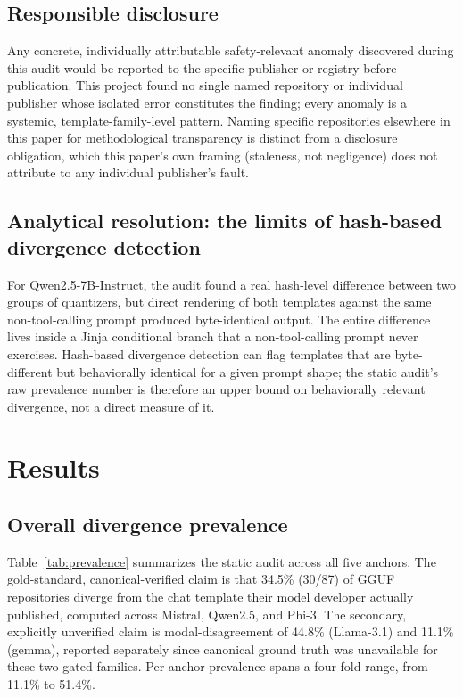 \documentclass[letterpaper,twocolumn,10pt]{article}
\begin{document}
\subsection{Responsible disclosure}

Any concrete, individually attributable safety-relevant anomaly discovered during this audit would be reported to the specific publisher or registry before publication. This project found no single named repository or individual publisher whose isolated error constitutes the finding; every anomaly is a systemic, template-family-level pattern. Naming specific repositories elsewhere in this paper for methodological transparency is distinct from a disclosure obligation, which this paper's own framing (staleness, not negligence) does not attribute to any individual publisher's fault.

\subsection{Analytical resolution: the limits of hash-based divergence detection}
\label{sec:analytical-resolution}

For Qwen2.5-7B-Instruct, the audit found a real hash-level difference between two groups of quantizers, but direct rendering of both templates against the same non-tool-calling prompt produced byte-identical output. The entire difference lives inside a Jinja conditional branch that a non-tool-calling prompt never exercises. Hash-based divergence detection can flag templates that are byte-different but behaviorally identical for a given prompt shape; the static audit's raw prevalence number is therefore an upper bound on behaviorally relevant divergence, not a direct measure of it.

\section{Results}
\label{sec:results}

\subsection{Overall divergence prevalence}

Table~\ref{tab:prevalence} summarizes the static audit across all five anchors. The gold-standard, canonical-verified claim is that 34.5\% (30/87) of GGUF repositories diverge from the chat template their model developer actually published, computed across Mistral, Qwen2.5, and Phi-3. The secondary, explicitly unverified claim is modal-disagreement of 44.8\% (Llama-3.1) and 11.1\% (gemma), reported separately since canonical ground truth was unavailable for these two gated families. Per-anchor prevalence spans a four-fold range, from 11.1\% to 51.4\%.
\end{document}
